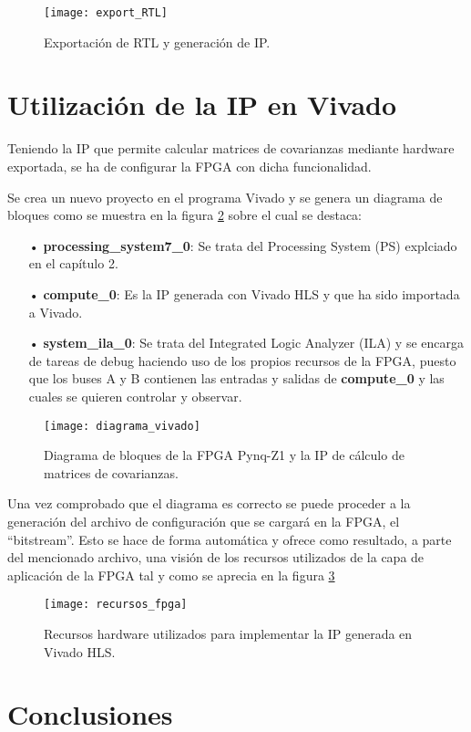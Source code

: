 \begin{figure}
\centering
\texttt{[image: export\_RTL]}
\caption{Exportación de RTL y generación de IP.}\label{fig:export_RTL}
\end{figure}

\section{Utilización de la IP en Vivado}
Teniendo la IP que permite calcular matrices de covarianzas mediante hardware exportada, se ha de configurar la FPGA con dicha funcionalidad.

Se crea un nuevo proyecto en el programa Vivado y se genera un diagrama de bloques como se muestra en la figura \ref{fig:diagrama_vivado} sobre el cual se destaca:
\begin{itemize}
\item[•] \textbf{processing\_system7\_0}: Se trata del Processing System (PS) explciado en el capítulo 2.
\item[•] \textbf{compute\_0}: Es la IP generada con Vivado HLS y que ha sido importada a Vivado.
\item[•] \textbf{system\_ila\_0}: Se trata del Integrated Logic Analyzer (ILA) y se encarga de tareas de debug haciendo uso de los propios recursos de la FPGA, puesto que los buses A y B contienen las entradas y salidas de \textbf{compute\_0} y las cuales se quieren controlar y observar.
\end{itemize}


\begin{figure}
\centering
\texttt{[image: diagrama\_vivado]}
\caption{Diagrama de bloques de la FPGA Pynq-Z1 y la IP de cálculo de matrices de covarianzas.}\label{fig:diagrama_vivado}
\end{figure}

Una vez comprobado que el diagrama es correcto se puede proceder a la generación del archivo de configuración que se cargará en la FPGA, el ``bitstream''. Esto se hace de forma automática y ofrece como resultado, a parte del mencionado archivo, una visión de los recursos utilizados de la capa de aplicación de la FPGA tal y como se aprecia en la figura \ref{fig:recursos_fpga}

\begin{figure}
\centering
\texttt{[image: recursos\_fpga]}
\caption{Recursos hardware utilizados para implementar la IP generada en Vivado HLS.}\label{fig:recursos_fpga}
\end{figure}


\section{Conclusiones}


